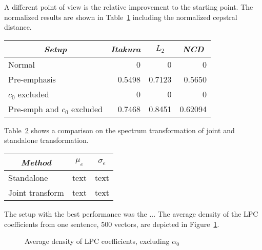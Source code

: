 A different point of view is the relative improvement to the starting point. The normalized results are shown in Table~\ref{tab:normalized_results} including the normalized cepstral distance.
\begin{table}[htbp]
	\begin{center}
		\label{tab:normalized_results}
		\begin{tabular}{lrrr}
			\toprule
			\multicolumn{1}{c}{\emph{Setup}} & \multicolumn{1}{c}{\emph{Itakura}} & \multicolumn{1}{c}{\emph{$L_2$}} & \multicolumn{1}{c}{\emph{NCD}}\\
			\midrule
			Normal & 0 & 0 & 0 \\
			Pre-emphasis & 0.5498 & 0.7123 & 0.5650 \\
			$c_0$ excluded & 0 & 0 & 0 \\
			Pre-emph and $c_0$ excluded & 0.7468 & 0.8451 & 0.62094 \\
			\bottomrule			
		\end{tabular}		
	\end{center}	
\end{table}

Table~\ref{tab:spectrum_joint_transform} shows a comparison on the spectrum transformation of joint and standalone transformation.
\begin{table}[htbp]
	\begin{center}
		\label{tab:spectrum_joint_transform}
		\begin{tabular}{lll}
			\toprule
			\multicolumn{1}{c}{\emph{Method}} & \multicolumn{1}{c}{\emph{$\mu_e$}} & \multicolumn{1}{c}{\emph{$\sigma_e$}}\\
			\midrule
			Standalone & text & text \\
			Joint transform & text & text \\
			\bottomrule			
		\end{tabular}		
	\end{center}	
\end{table}



The setup with the best performance was the ... The average density of the LPC coefficients from one sentence, 500 vectors, are depicted in Figure~\ref{fig:hist_lpc}. 
\begin{figure}[htbp]
	\begin{center}
	\caption{Average density of LPC coefficients, excluding $\alpha_0$}
	\label{fig:hist_lpc}
	\end{center}
\end{figure}


